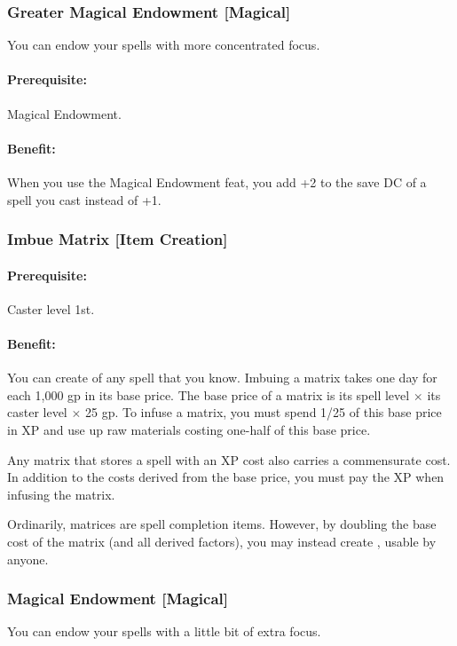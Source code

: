 \subsubsection[Greater Magical Endowment]{Greater Magical Endowment [Magical]}
\label{Feat:GreaterMagicalEndowment}
You can endow your spells with more concentrated focus.

\paragraph{Prerequisite:} Magical Endowment.

\paragraph{Benefit:} When you use the Magical Endowment feat, you add +2 to the save DC of a spell you cast instead of +1.
\subsubsection[Imbue Matrix]{Imbue Matrix [Item Creation]}
\label{Feat:ImbueMatrix}
\paragraph{Prerequisite:}
Caster level 1st.

\paragraph{Benefit:}
You can create  of any spell that you know. 
Imbuing a matrix takes one day for each 1,000 gp in its base price. 
The base price of a matrix is its spell level $\times$ its caster level $\times$ 25 gp.%
To infuse a matrix, you must spend 1/25 of this base price in XP and use up raw materials costing one-half of this base price.

Any matrix that stores a spell with an XP cost also carries a commensurate cost. 
In addition to the costs derived from the base price, you must pay the XP when infusing the matrix.

Ordinarily, matrices are spell completion items. 
However, by doubling the base cost of the matrix (and all derived factors), you may instead create , usable by anyone.
\subsubsection[Magical Endowment]{Magical Endowment [Magical]}
\label{Feat:MagicalEndowment}
You can endow your spells with a little bit of extra focus.

